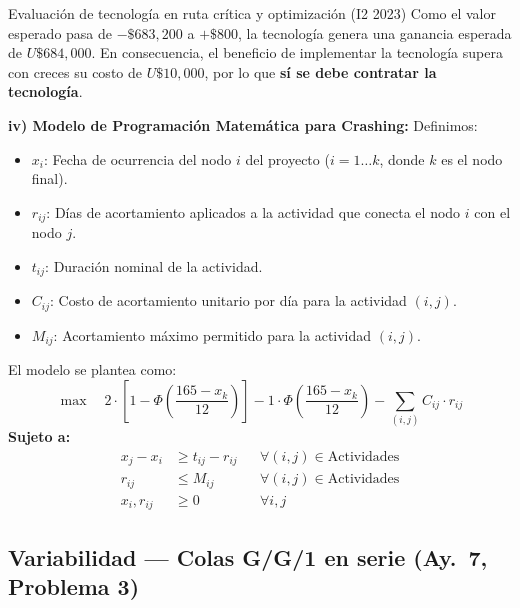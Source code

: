 \begin{ejercicio}{Evaluación de tecnología en ruta crítica y optimización (I2 2023)}
Como el valor esperado pasa de $-\$683{,}200$ a $+\$800$, la tecnología genera una ganancia esperada de $U\$684{,}000$. En consecuencia, el beneficio de implementar la tecnología supera con creces su costo de $U\$10{,}000$, por lo que \textbf{sí se debe contratar la tecnología}.

\textbf{iv) Modelo de Programación Matemática para Crashing:}
Definimos:
\begin{itemize}[leftmargin=1.4em, itemsep=0pt]
  \item $x_i$: Fecha de ocurrencia del nodo $i$ del proyecto ($i=1 \dots k$, donde $k$ es el nodo final).
  \item $r_{ij}$: Días de acortamiento aplicados a la actividad que conecta el nodo $i$ con el nodo $j$.
  \item $t_{ij}$: Duración nominal de la actividad.
  \item $C_{ij}$: Costo de acortamiento unitario por día para la actividad $(i,j)$.
  \item $M_{ij}$: Acortamiento máximo permitido para la actividad $(i,j)$.
\end{itemize}

El modelo se plantea como:
\[
  \max \quad 2 \cdot \left[1 - \Phi\left(\frac{165 - x_k}{12}\right)\right] - 1 \cdot \Phi\left(\frac{165 - x_k}{12}\right) - \sum_{(i,j)} C_{ij} \cdot r_{ij}
\]
\textbf{Sujeto a:}
\begin{align*}
  x_j - x_i &\ge t_{ij} - r_{ij} && \forall (i,j) \in \text{Actividades} \\
  r_{ij} &\le M_{ij} && \forall (i,j) \in \text{Actividades} \\
  x_i, r_{ij} &\ge 0 && \forall i, j
\end{align*}
\end{ejercicio}


\subsection[Variabilidad: G/G/1 en Serie]{Variabilidad --- Colas G/G/1 en serie (Ay.\ 7, Problema 3)}

